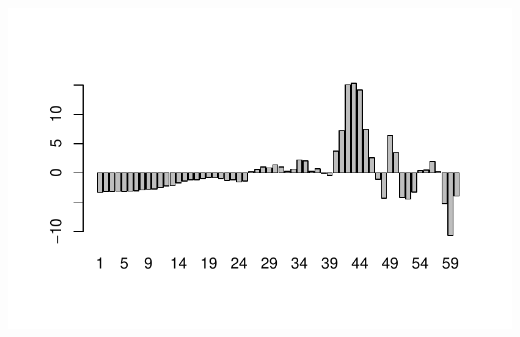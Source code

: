\documentclass[
  letterpaper,
  DIV=11,
  numbers=noendperiod]{scrartcl}
\begin{document}
\includegraphics{Spurious-Regressions_files/figure-pdf/unnamed-chunk-2-2.pdf}

 
  \providecommand{\huxb}[2]{\arrayrulecolor[RGB]{#1}\global\arrayrulewidth=#2pt}
  \providecommand{\huxvb}[2]{\color[RGB]{#1}\vrule width #2pt}
  \providecommand{\huxtpad}[1]{\rule{0pt}{#1}}
  \providecommand{\huxbpad}[1]{\rule[-#1]{0pt}{#1}}
\end{document}
